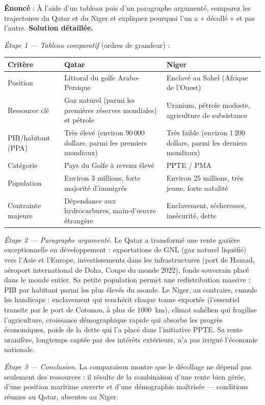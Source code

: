\documentclass[11pt]{article}
\begin{document}
\begin{exoresolu}
\textbf{Énoncé} : À l'aide d'un tableau puis d'un paragraphe argumenté, comparez les trajectoires du Qatar et du Niger et expliquez pourquoi l'un a « décollé » et pas l'autre.
\tcblower
\textbf{Solution détaillée.}

\emph{Étape 1 — Tableau comparatif} (ordres de grandeur) :

\begin{center}
\begin{tabularx}{\linewidth}{|l|X|X|}
\hline
\rowcolor{popblueL} \textbf{Critère} & \textbf{Qatar} & \textbf{Niger} \\
\hline
Position & Littoral du golfe Arabo-Persique & Enclavé au Sahel (Afrique de l'Ouest) \\
\hline
Ressource clé & Gaz naturel (parmi les premières réserves mondiales) et pétrole & Uranium, pétrole modeste, agriculture de subsistance \\
\hline
PIB/habitant (PPA) & Très élevé (environ 90\,000 dollars, parmi les premiers mondiaux) & Très faible (environ 1\,200 dollars, parmi les derniers mondiaux) \\
\hline
Catégorie & Pays du Golfe à revenu élevé & PPTE / PMA \\
\hline
Population & Environ 3 millions, forte majorité d'immigrés & Environ 25 millions, très jeune, forte natalité \\
\hline
Contrainte majeure & Dépendance aux hydrocarbures, main-d'œuvre étrangère & Enclavement, sécheresses, insécurité, dette \\
\hline
\end{tabularx}
\end{center}

\emph{Étape 2 — Paragraphe argumenté.} Le Qatar a transformé une rente gazière exceptionnelle en développement : exportations de GNL (gaz naturel liquéfié) vers l'Asie et l'Europe, investissements dans les infrastructures (port de Hamad, aéroport international de Doha, Coupe du monde 2022), fonds souverain placé dans le monde entier. Sa petite population permet une redistribution massive : PIB par habitant parmi les plus élevés du monde. Le Niger, au contraire, cumule les handicaps : enclavement qui renchérit chaque tonne exportée (l'essentiel transite par le port de Cotonou, à plus de \SI{1000}{km}), climat sahélien qui fragilise l'agriculture, croissance démographique rapide qui absorbe les progrès économiques, poids de la dette qui l'a placé dans l'initiative PPTE. Sa rente uranifère, longtemps captée par des intérêts extérieurs, n'a pas irrigué l'économie nationale.

\emph{Étape 3 — Conclusion.} La comparaison montre que le décollage ne dépend pas seulement des ressources : il résulte de la combinaison d'une rente bien gérée, d'une position maritime ouverte et d'une démographie maîtrisée — conditions réunies au Qatar, absentes au Niger.
\end{exoresolu}
\end{document}
